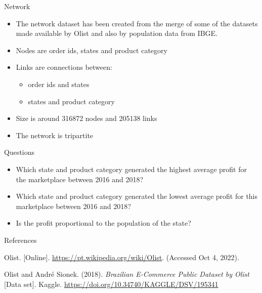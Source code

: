 \documentclass[aspectratio=169]{beamer}
\begin{document}
\begin{frame}{Network}
\begin{itemize}
    \item The network dataset has been created from the merge of some of the
            datasets made available by Olist and also by population data from
            IBGE.
    \item Nodes are order ids, states and product category
    \item Links are connections between:
        \begin{itemize}
            \item order ids and states
            \item states and product category
        \end{itemize}
    \item Size is around 316872 nodes and 205138 links
    \item The network is tripartite
\end{itemize}
\end{frame}

\begin{frame}{Questions}
\begin{itemize}
    \item Which state and product category generated the highest average profit
            for the marketplace between 2016 and 2018?
    \item Which state and product category generated the lowest average profit
            for this marketplace between 2016 and 2018?
    \item Is the profit proportional to the population of the state?
\end{itemize}
\end{frame}

\begin{frame}{References}


\begin{thebibliography}{2}

 Olist. [Online]. \url{https://pt.wikipedia.org/wiki/Olist}.
(Accessed Oct 4, 2022).

 Olist and André Sionek. (2018). {\em Brazilian
E-Commerce Public Dataset by Olist} [Data set]. Kaggle.
\url{https://doi.org/10.34740/KAGGLE/DSV/195341}

\end{thebibliography}
\end{frame}
\end{document}
